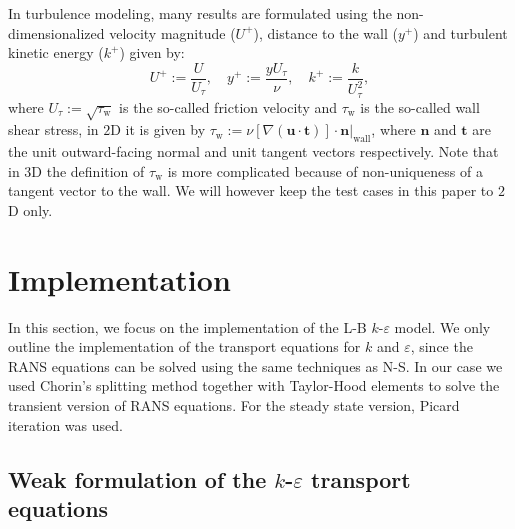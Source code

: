 In turbulence modeling, many results are formulated using the non-dimensionalized velocity magnitude (\(U^+\)), distance to the wall (\(y^+\)) and turbulent kinetic energy (\(k^+\)) given by:
\begin{equation}\label{eq: non-dimensionalized variables}
    U^+ := \frac{U}{U_\tau},
    \quad
    y^+ := \frac{y U_\tau}{\nu},
    \quad
    k^+ := \frac{k}{U_\tau^2},
\end{equation}
where \(U_\tau := \sqrt{\tau_\text{w}}\) is the so-called friction velocity and \(\tau_\text{w}\) is the so-called wall shear stress, in \(2\)D it is given by \( \tau_\text{w} := \left. \nu [\nabla (\mathbf{u} \cdot \mathbf{t})] \cdot \mathbf{n} \right\rvert_\text{wall} \), where \(\mathbf{n}\) and \(\mathbf{t}\) are the unit outward-facing normal and unit tangent vectors respectively. Note that in \(3\)D the definition of \(\tau_\text{w}\) is more complicated because of non-uniqueness of a tangent vector to the wall. We will however keep the test cases in this paper to \(2\)D only.

\section{Implementation}

In this section, we focus on the implementation of the L-B \(k\)-\(\varepsilon\) model. We only outline the implementation of the transport equations for \(k\) and \(\varepsilon\), since the RANS equations can be solved using the same techniques as N-S. In our case we used Chorin's splitting method together with Taylor-Hood elements to solve the transient version of RANS equations. For the steady state version, Picard iteration was used. 

\subsection{Weak formulation of the \texorpdfstring{\(k\)-\(\varepsilon\)}{k-e} transport equations}

